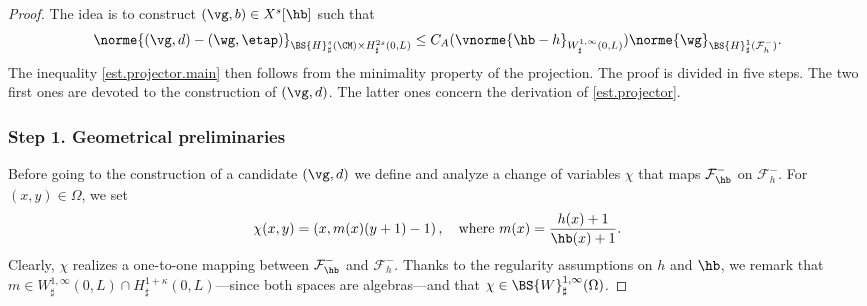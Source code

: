 \begin{proof}
The idea is to construct $(\vg,b)\in X^{s}[\hb]$ such that
\begin{equation}\label{est.projector}
\norme{(\vg,d) -(\wg,\etap)}_{\BS{H}^{s}_{\sharp}(\CM)\times H^{2s}_{\sharp}(0,L)}\leq C_{A}(\vnorme{\hb -h }_{W^{1,\infty}_{\sharp}(0,L)})\norme{\wg}_{\BS{H}^{1}_{\sharp}(\mathcal{F}^{-}_{h})}.
\end{equation}
The inequality \eqref{est.projector.main} then follows from the minimality property of the projection.
The proof is divided in five steps. The two first ones are devoted to the construction of $(\vg,d)$. The latter ones
concern the derivation of \eqref{est.projector}.

\subsubsection*{Step 1. Geometrical preliminaries}
Before going to the construction of a candidate $(\vg,d)$ we define and analyze a change of variables
$\chi$ that maps $\mathcal{F}^-_{\hb}$ on $\mathcal{F}^-_{h}$. For $(x,y) \in \Omega$, we set
\[
\chi(x,y) = \left(x,m(x)(y+1)-1\right), \quad \text{where } m(x) = \frac{h(x)+1}{\hb(x)+1}.
\]
Clearly, $\chi$ realizes a one-to-one mapping between $\mathcal{F}^-_{\hb}$ and $\mathcal{F}^-_{h}$.
Thanks to the regularity assumptions on $h$ and $\hb$, we remark that $m\in W_\sharp^{1,\infty}(0, L)\cap H_\sharp^{1+\kappa}(0, L)$---since both spaces are algebras---and that $\chi \in \BS{W}_\sharp^{1, \infty}(\Omega)$.


\end{proof}
